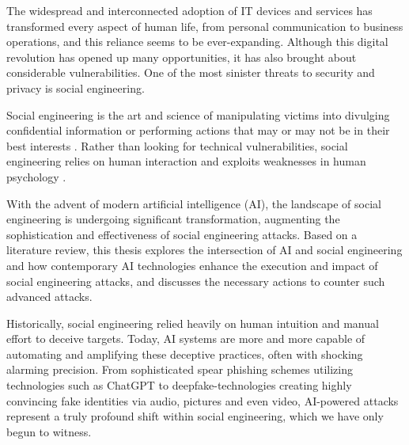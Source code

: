 The widespread and interconnected adoption of IT devices and services has transformed every aspect of human life, from personal communication to business operations, and this reliance seems to be ever-expanding. Although this digital revolution has opened up many opportunities, it has also brought about considerable vulnerabilities. One of the most sinister threats to security and privacy is social engineering.%

Social engineering is the art and science of manipulating victims into divulging confidential information or performing actions that may or may not be in their best interests \citep{hadnagySocialEngineering2018}. Rather than looking for technical vulnerabilities, social engineering relies on human interaction and exploits weaknesses in human psychology \citep{wangDefiningSocialEngineering2020}.

With the advent of modern artificial intelligence (AI), the landscape of social engineering is undergoing significant transformation, augmenting the sophistication and effectiveness of social engineering attacks. Based on a literature review, this thesis explores the intersection of AI and social engineering and how contemporary AI technologies enhance the execution and impact of social engineering attacks, and discusses the necessary actions to counter such advanced attacks.


Historically, social engineering relied heavily on human intuition and manual effort to deceive targets. Today, AI systems are more and more capable of automating and amplifying these deceptive practices, often with shocking alarming precision. From sophisticated spear phishing schemes utilizing technologies such as ChatGPT to deepfake-technologies creating highly convincing fake identities via audio, pictures and even video, AI-powered attacks represent a truly profound shift within social engineering, which we have only begun to witness.


